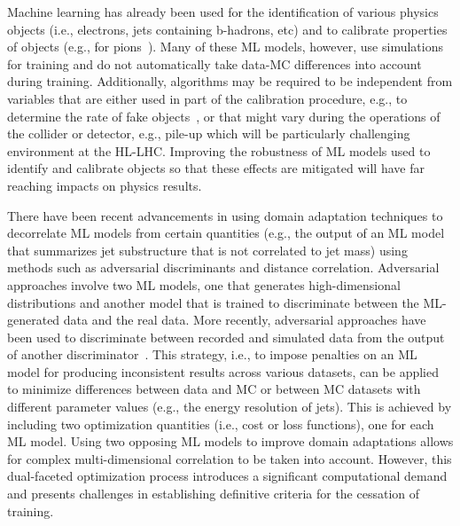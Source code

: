 \documentclass[letter, USenglish, 11pt, subfigure]{article}
\begin{document}
Machine learning has already been used for the identification of various physics objects (i.e., electrons, jets containing b-hadrons, etc) and to calibrate properties of objects (e.g., for pions~\cite{ATL-PHYS-PUB-2020-018}). Many of these ML models, however, use simulations for training and do not automatically take data-MC differences into account during training. Additionally, algorithms may be required to be independent from variables that are either used in part of the calibration procedure, e.g., to determine the rate of fake objects~\cite{atlas_photon_id}, or that might vary during the operations of the collider or detector, e.g., pile-up which will be particularly challenging environment at the HL-LHC. Improving the robustness of ML models used to identify and calibrate objects so that these effects are mitigated will have far reaching impacts on physics results.

There have been recent advancements in using domain adaptation techniques to decorrelate ML models from certain quantities (e.g., the output of an ML model that summarizes jet substructure that is not correlated to jet mass) using methods such as adversarial discriminants and distance correlation.
Adversarial approaches involve two ML models, one that generates high-dimensional distributions and another model that is trained to discriminate between the ML-generated data and the real data. More recently, adversarial approaches have been used to discriminate between recorded and simulated data from the output of another discriminator~\cite{calRatio}. This strategy, i.e., to impose penalties on an ML model for producing inconsistent results across various datasets, can be applied to minimize differences between data and MC or between MC datasets with different parameter values (e.g., the energy resolution of jets). This is achieved by including two optimization quantities (i.e., cost or loss functions), one for each ML model. Using two opposing ML models to improve domain adaptations allows for complex multi-dimensional correlation to be taken into account. However, this dual-faceted optimization process introduces a significant computational demand and presents challenges in establishing definitive criteria for the cessation of training.
\end{document}
